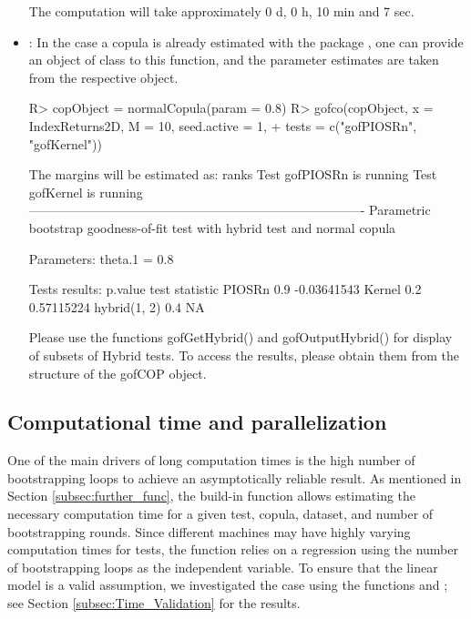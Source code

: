 \begin{itemize}
\begin{example}
The computation will take approximately 0 d, 0 h, 10 min and 7 sec.
\end{example}
\bk \bigskip
    \item {}: In the case a copula is already estimated with the package , one can provide an object of class  to this function, and the parameter estimates are taken from the respective object.
\begin{example}
R> copObject = normalCopula(param = 0.8)
R> gofco(copObject, x = IndexReturns2D, M = 10, seed.active = 1,
+        tests = c("gofPIOSRn", "gofKernel"))
\end{example}
\begin{example}
The margins will be estimated as: ranks
Test gofPIOSRn is running
Test gofKernel is running                                                
-------------------------------------------------------------------------------
Parametric bootstrap goodness-of-fit test with hybrid test and normal copula

Parameters:
theta.1 = 0.8

Tests results:
             p.value test statistic
PIOSRn           0.9    -0.03641543
Kernel           0.2     0.57115224
hybrid(1, 2)     0.4             NA

Please use the functions gofGetHybrid() and gofOutputHybrid() for 
display of subsets of Hybrid tests. To access the results, please 
obtain them from the structure of the gofCOP object.
\end{example}
\end{itemize}

\subsection{Computational time and parallelization}
\label{sec:TimeParallelization}
One of the main drivers of long computation times is the high number of bootstrapping loops to achieve an asymptotically reliable result. As mentioned in Section \ref{subsec:further_func}, the build-in function  allows estimating the necessary computation time for a given test, copula, dataset, and number of bootstrapping rounds. Since different machines may have highly varying computation times for tests, the function relies on a regression using the number of bootstrapping loops as the independent variable. To ensure that the linear model is a valid assumption, we investigated the case using the functions \mycolor {} \bk and ; see Section \ref{subsec:Time_Validation} for the results.

